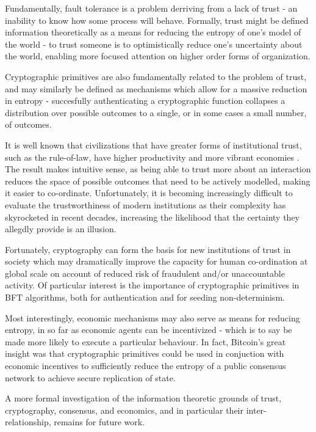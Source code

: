 Fundamentally, fault tolerance is a problem derriving from a lack of trust - 
an inability to know how some process will behave.
Formally, trust might be defined information theoretically as a means
for reducing the entropy of one's model of the world - 
to trust someone is to optimistically reduce one's uncertainty about the world,
enabling more focused attention on higher order forms of organization.

Cryptographic primitives are also fundamentally related to the problem of trust,
and may similarly be defined as mechanisms which allow for a massive reduction in entropy -
succesfully authenticating a cryptographic function collapses a distribution 
over possible outcomes to a single, or in some cases a small number, of outcomes.

It is well known that civilizations that have greater forms of institutional trust,
such as the rule-of-law, 
have higher productivity and more vibrant economies \cite{trust}.
The result makes intuitive sense, as being able to trust more about an interaction 
reduces the space of possible outcomes that need to be actively modelled,
making it easier to co-ordinate.
Unfortunately, it is becoming increasingly difficult to evaluate the trustworthiness 
of modern institutions as their complexity has skyrocketed in recent decades,
increasing the likelihood that the certainty they allegdly provide is an illusion.

Fortunately, cryptography can form the basis for new institutions of trust in society 
which may dramatically improve the capacity for human co-ordination at global scale on account
of reduced risk of fraudulent and/or unaccountable activity.
Of particular interest is the importance of cryptographic primitives in BFT algorithms,
both for authentication and for seeding non-determinism.

Most interestingly, economic mechanisms may also serve as means for reducing entropy,
in so far as economic agents can be incentivized - 
which is to say be made more likely to execute a particular behaviour.
In fact, Bitcoin's great insight was that cryptographic primitives could be used in
conjuction with economic incentives to sufficiently reduce the entropy of a public consensus network
to achieve secure replication of state.

A more formal investigation of the information theoretic grounds of trust, cryptography,
consensus, and economics, and in particular their inter-relationship, remains for future work.

